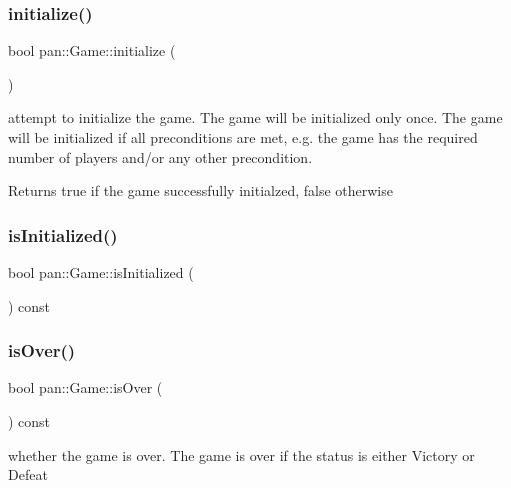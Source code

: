 \subsubsection{\texorpdfstring{initialize()}{initialize()}}
{\footnotesize\ttfamily bool pan\+::\+Game\+::initialize (\begin{DoxyParamCaption}{ }\end{DoxyParamCaption})}

attempt to initialize the game. The game will be initialized only once. The game will be initialized if all preconditions are met, e.\+g. the game has the required number of players and/or any other precondition. \begin{DoxyReturn}{Returns}
true if the game successfully initialzed, false otherwise 
\end{DoxyReturn}
\mbox{\label{classpan_1_1_game_a145be880607e15e9ca91ceb36a012de1}} 
\subsubsection{\texorpdfstring{is\+Initialized()}{isInitialized()}}
{\footnotesize\ttfamily bool pan\+::\+Game\+::is\+Initialized (\begin{DoxyParamCaption}{ }\end{DoxyParamCaption}) const\hspace{0.3cm}{\ttfamily [inline]}}

\mbox{\label{classpan_1_1_game_aa662e441f8910685ef4eb61f76f22354}} 
\subsubsection{\texorpdfstring{is\+Over()}{isOver()}}
{\footnotesize\ttfamily bool pan\+::\+Game\+::is\+Over (\begin{DoxyParamCaption}{ }\end{DoxyParamCaption}) const\hspace{0.3cm}{\ttfamily [inline]}}

whether the game is over. The game is over if the status is either Victory or Defeat \mbox{\label{classpan_1_1_game_a3e462af43777e6159bd7ff4c3ca0815c}} 
